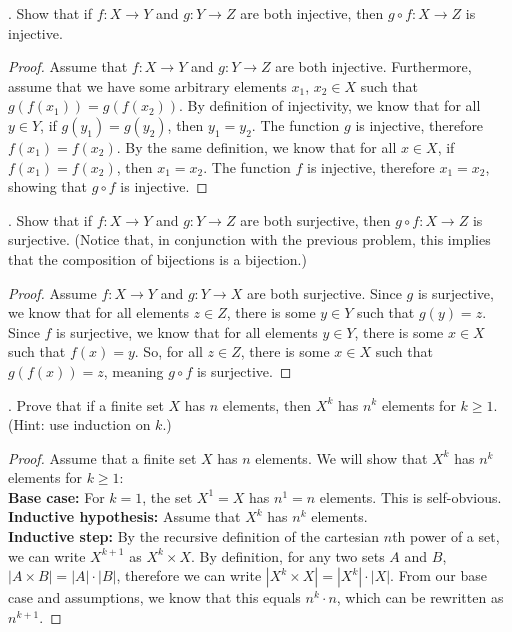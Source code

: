 \documentclass[11pt]{article}
\begin{document}
\newpage
{}. Show that if $f: X \to Y$ and $g: Y \to Z$ are both injective, then $g \circ f: X \to Z$ is injective. \\

\color{RoyalBlue}
\begin{proof}
Assume that $f: X \to Y$ and $g: Y \to Z$ are both injective. Furthermore, assume that we have some arbitrary elements $x_1$, $x_2 \in X$ such that $g(f(x_1)) = g(f(x_2))$. By definition of injectivity, we know that for all $y \in Y$, if $g(y_1) = g(y_2)$, then $y_1 = y_2$. The function $g$ is injective, therefore $f(x_1) = f(x_2)$. By the same definition, we know that for all $x \in X$, if $f(x_1) = f(x_2)$, then $x_1 = x_2$. The function $f$ is injective, therefore $x_1 = x_2$, showing that $g \circ f$ is injective.
\end{proof}
\color{black}


\newpage
{}. Show that if $f: X \to Y$ and $g: Y \to Z$ are both surjective, then $g \circ f: X \to Z$ is surjective. (Notice that, in conjunction with the previous problem, this implies that the composition of bijections is a bijection.)

\color{RoyalBlue}
\begin{proof}
Assume $f: X \to Y$ and $g: Y \to X$ are both surjective. Since $g$ is surjective, we know that for all elements $z \in Z$, there is some $y \in Y$ such that $g(y) = z$. Since $f$ is surjective, we know that for all elements $y \in Y$, there is some $x \in X$ such that $f(x) = y$. So, for all $z \in Z$, there is some $x \in X$ such that $g(f(x)) = z$, meaning $g \circ f$ is surjective.
\end{proof}
\color{black}


\newpage
{}. Prove that if a finite set $X$ has $n$ elements, then $X^k$ has $n^k$ elements for $k \geq 1$. (Hint: use induction on $k$.)

\color{RoyalBlue}
\begin{proof}
Assume that a finite set $X$ has $n$ elements. We will show that $X^k$ has $n^k$ elements for $k \geq 1$: \\
\textbf{Base case:} For $k = 1$, the set $X^1 = X$ has $n^1 = n$ elements. This is self-obvious. \\
\textbf{Inductive hypothesis:} Assume that $X^k$ has $n^k$ elements. \\
\textbf{Inductive step:} By the recursive definition of the cartesian $n$th power of a set, we can write $X^{k+1}$ as $X^k \times X$. By definition, for any two sets $A$ and $B$, $|A \times B| = |A| \cdot |B|$, therefore we can write $|X^k \times X| = |X^k| \cdot |X|$. From our base case and assumptions, we know that this equals $n^k \cdot n$, which can be rewritten as $n^{k+1}$.
\end{proof}
\color{black}
\end{document}

